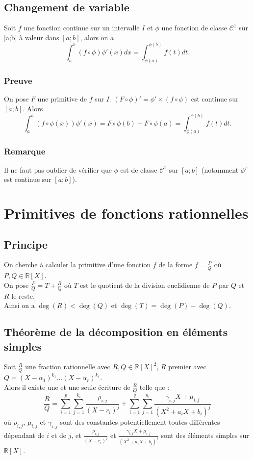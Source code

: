\documentclass[a4paper,10pt]{book} %
\newcommand{\R}{\mathbb{R}}
\begin{document}
\subsection{Changement de variable}
Soit $f$ une fonction continue sur un intervalle $I$ et $\phi$ une fonction de classe $\mathcal{C}^1$ sur [a;b] à valeur dans $[a;b]$, alors on a
$$\int_{a}^{b}(f\circ\phi)\phi'(x)dx=\int_{\phi(a)}^{\phi(b)}f(t)dt.$$

\subsubsection{Preuve}
On pose $F$ une primitive de $f$ sur $I$.
$(F\circ \phi)'=\phi'\times (f\circ\phi)$ est continue sur $[a;b]$. Alors
$$\displaystyle\int_{a}^{b}(f\circ \phi(x))\phi'(x)=F\circ\phi(b)-F\circ \phi(a)=\int_{\phi(a)}^{\phi(b)}f(t)dt.$$

\subsubsection{Remarque}
Il ne faut pas oublier de vérifier que $\phi$ est de classe $\mathcal{C}^1$ sur $[a;b]$ (notamment $\phi'$ est continue sur $[a;b]$).

\newpage

\section{Primitives de fonctions rationnelles}
\subsection{Principe}
On cherche à calculer la primitive d'une fonction $f$ de la forme $f=\frac{P}{Q}$ où $P,Q\in\R[X]$.\\

On pose $\frac{P}{Q}=T+\frac{R}{Q}$ où $T$ est le quotient de la division euclidienne de $P$ par $Q$ et $R$ le reste.\\
Ainsi on a $\deg(R)<\deg(Q)$ et $\deg(T)=\deg(P)-\deg(Q)$.

\subsection{Théorème de la décomposition en éléments simples}
Soit $\frac{R}{Q}$ une fraction rationnelle avec $R,Q\in \R[X]^{2}$, $R$ premier avec $Q=(X-\alpha_{1})^{k_{1}}...(X-\alpha_{r})^{k_{r}}$.\\

Alors il existe une et une seule écriture de $\frac{R}{Q}$ telle que :
$$\frac{R}{Q}=\sum\limits_{i=1}^p\sum\limits_{j=1}^{k_i}
\frac{\rho_{i,j}}{(X-r_i)^j}+\sum\limits_{i=1}^{q}\sum\limits_{j=1}^{n_i} \frac{\gamma_{i,j}X+\mu_{i,j}}{(X^2+a_iX+b_i)^j}$$
où $\rho_{i,j}$, $\mu_{i,j}$ et $\gamma_{i,j}$ sont des constantes potentiellement toutes différentes dépendant de $i$ et de $j$, et $\displaystyle\frac{\rho_{i,j}}{(X-r_i)^{j}}$ et $\displaystyle\frac{\gamma_{i,j}X+\mu_{i,j}}{(X^2+a_iX+b_i)^j}$ sont des éléments simples sur $\R[X]$.\\
\end{document}
